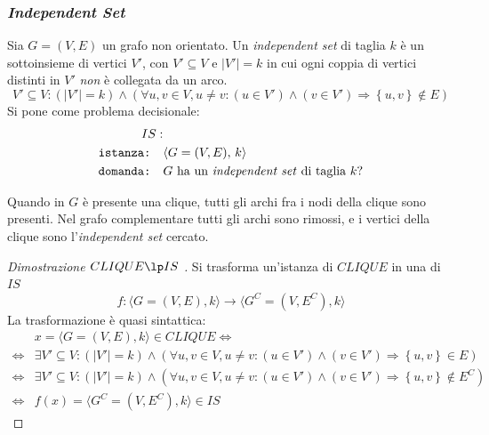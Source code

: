 \subsubsection{\emph{Independent Set}}

\begin{definition}
    \label{def:indset}
    Sia $G=(V,E)$ un grafo non orientato. Un \emph{independent set} di taglia $k$ è un sottoinsieme di vertici $V'$, con $V' \subseteq V$ e $|V'| = k$
    in cui ogni coppia di vertici distinti in $V'$ \emph{non} è collegata da un arco.
    \begin{equation*}
        V' \subseteq V : 
        \left( |V'| = k \right)
        \wedge
        \left( 
            \forall u, v \in V, u \ne v :
            \left( u \in V' \right) \wedge \left( v \in V' \right)
            \Rightarrow
            \left\{ u,v \right\} \notin E
        \right)
    \end{equation*}
Si pone come problema decisionale:
\begin{align*}
    IS: & \\
    \texttt{istanza:} \quad & \langle G=(V,E), \, k \rangle \\
    \texttt{domanda:} \quad & G \text{ ha un \emph{independent set} di taglia } k?
\end{align*}
\end{definition}

Quando in $G$ è presente una clique, tutti gli archi fra i nodi della clique sono presenti. Nel grafo complementare tutti gli archi sono rimossi, e i vertici della clique sono l'\emph{independent set} cercato.
\begin{proof}[Dimostrazione $ CLIQUE \lp IS $ ]
Si trasforma un'istanza di $CLIQUE$ in una di $IS$
\begin{equation*}
    f : \langle G = (V,E), k \rangle  \to  \langle G^C = (V,E^C), k \rangle
\end{equation*}
La trasformazione è quasi sintattica:
\begin{align*}
    &
    x = \langle G = (V,E), k \rangle \in CLIQUE \Leftrightarrow
    \\
    \Leftrightarrow &
    \exists V' \subseteq V : 
    \left( |V'| = k \right)
    \wedge
    \left( 
        \forall u, v \in V, u \ne v :
        \left( u \in V' \right) \wedge \left( v \in V' \right)
        \Rightarrow
        \left\{ u,v \right\} \in E
    \right)
    \\
    \Leftrightarrow &
    \exists V' \subseteq V : 
    \left( |V'| = k \right)
    \wedge
    \left( 
        \forall u, v \in V, u \ne v :
        \left( u \in V' \right) \wedge \left( v \in V' \right)
        \Rightarrow
        \left\{ u,v \right\} \notin E^C
    \right)
    \\
    \Leftrightarrow &
    f(x) = \langle G^C = (V,E^C), k \rangle \in IS
\end{align*}
\end{proof}

